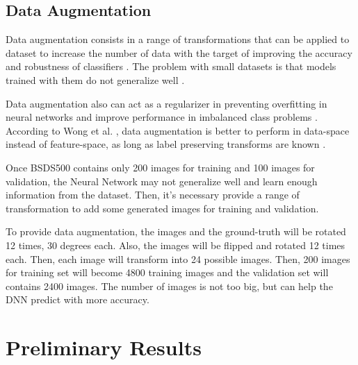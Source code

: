 \documentclass[10pt,twocolumn,letterpaper]{article}
\begin{document}
\subsection{Data Augmentation} \label{ssec:data_augmentation}

Data augmentation consists in a range of transformations that can be applied to dataset to increase the number of data with the target of improving the
accuracy and robustness of classifiers \cite{AUGM_ADAPT}. The problem with small datasets is that models trained with them do not generalize well \cite{AUGM_DEEP}.

Data augmentation also can act as a regularizer in preventing overfitting in neural networks and improve performance in imbalanced class problems \cite{DATA_AUGM}. According to Wong et al. \cite{DATA_AUGM}, data augmentation is better to perform in data-space instead of feature-space, as long as label preserving transforms are known \cite{DATA_AUGM}.

Once BSDS500 contains only 200 images for training and 100 images for validation, the Neural Network may not generalize well and learn enough information from the dataset. Then, it's necessary provide a range of transformation to add some generated images for training and validation.

To provide data augmentation, the images and the ground-truth will be rotated 12 times, 30 degrees each. Also, the images will be flipped and rotated 12 times each. Then, each image will transform into 24 possible images. Then, 200 images for training set will become 4800 training images and the validation set will contains 2400 images. The number of images is not too big, but can help the DNN predict with more accuracy.

\section{Preliminary Results} \label{sec:results}



{\small


}
\end{document}
